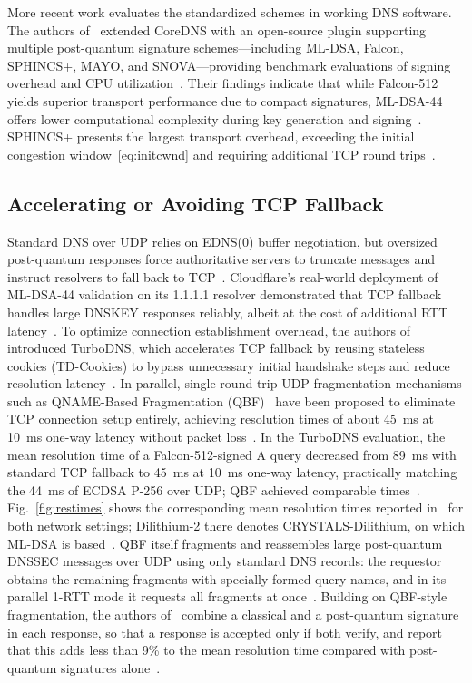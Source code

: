 \documentclass[conference]{IEEEtran}
\begin{document}
More recent work evaluates the standardized schemes in working DNS software.
The authors of~\cite{corednspqc} extended CoreDNS with an open-source plugin
supporting multiple post-quantum signature schemes---including ML-DSA, Falcon,
SPHINCS+, MAYO, and SNOVA---providing benchmark evaluations of signing overhead
and CPU utilization~\cite{corednspqc}. Their findings indicate that while
Falcon-512 yields superior transport performance due to compact signatures,
ML-DSA-44 offers lower computational complexity during key generation and
signing~\cite{corednspqc}. SPHINCS+ presents the largest transport overhead,
exceeding the initial congestion window~\eqref{eq:initcwnd} and requiring
additional TCP round trips~\cite{turbodns}.

\subsection{Accelerating or Avoiding TCP Fallback}
\label{sec:rw-tcp}

Standard DNS over UDP relies on EDNS(0) buffer negotiation, but oversized
post-quantum responses force authoritative servers to truncate messages and
instruct resolvers to fall back to TCP~\cite{rfc7766}. Cloudflare's real-world
deployment of ML-DSA-44 validation on its 1.1.1.1 resolver demonstrated that
TCP fallback handles large DNSKEY responses reliably, albeit at the cost of
additional RTT latency~\cite{cloudflareblog}. To optimize connection
establishment overhead, the authors of~\cite{turbodns} introduced TurboDNS,
which accelerates TCP fallback by reusing stateless cookies (TD-Cookies) to
bypass unnecessary initial handshake steps and reduce resolution
latency~\cite{turbodns}. In parallel, single-round-trip UDP fragmentation
mechanisms such as QNAME-Based Fragmentation (QBF)~\cite{qbf} have been
proposed to eliminate TCP connection setup entirely, achieving resolution times
of about 45~ms at 10~ms one-way latency without packet loss~\cite{turbodns}. In
the TurboDNS evaluation, the mean resolution time of a Falcon-512-signed A
query decreased from 89~ms with standard TCP fallback to 45~ms at 10~ms one-way
latency, practically matching the 44~ms of ECDSA P-256 over UDP; QBF achieved
comparable times~\cite{turbodns}. Fig.~\ref{fig:restimes} shows the
corresponding mean resolution times reported in~\cite{turbodns} for both
network settings; Dilithium-2 there denotes CRYSTALS-Dilithium, on which ML-DSA
is based~\cite{fips204}. QBF itself fragments and reassembles large
post-quantum DNSSEC messages over UDP using only standard DNS records: the
requestor obtains the remaining fragments with specially formed query names,
and in its parallel 1-RTT mode it requests all fragments at once~\cite{qbf}.
Building on QBF-style fragmentation, the authors of~\cite{doublesigned}
combine a classical and a post-quantum signature in each response, so that a
response is accepted only if both verify, and report that this adds less than
9\% to the mean resolution time compared with post-quantum signatures
alone~\cite{doublesigned}.
\end{document}
